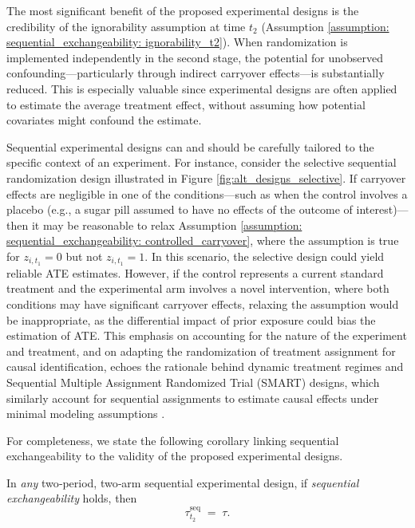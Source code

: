 The most significant benefit of the proposed experimental designs is the credibility of the ignorability assumption at time \(t_2\) (Assumption \ref{assumption: sequential_exchangeability: ignorability_t2}). When randomization is implemented independently in the second stage, the potential for unobserved confounding—particularly through indirect carryover effects—is substantially reduced. This is especially valuable since  experimental designs are often applied to estimate the average treatment effect, without assuming how potential covariates might confound the estimate. 

Sequential experimental designs can and should be carefully tailored to the specific context of an experiment. For instance, consider the selective sequential randomization design illustrated in Figure \ref{fig:alt_designs_selective}. If carryover effects are negligible in one of the conditions—such as when the control involves a placebo (e.g., a sugar pill assumed to have no effects of the outcome of interest)—then it may be reasonable to relax Assumption \ref{assumption: sequential_exchangeability: controlled_carryover}, where the assumption is true for \(z_{i,t_1} = 0\) but not \(z_{i,t_1} = 1\). In this scenario, the selective design could yield reliable ATE estimates. However, if the control represents a current standard treatment and the experimental arm involves a novel intervention, where both conditions may have significant carryover effects, relaxing the assumption would be inappropriate, as the differential impact of prior exposure could bias the estimation of ATE. This emphasis on accounting for the nature of the experiment and treatment, and on adapting the randomization of treatment assignment for causal identification, echoes the rationale behind dynamic treatment regimes and Sequential Multiple Assignment Randomized Trial (SMART) designs, which similarly account for sequential assignments to estimate causal effects under minimal modeling assumptions \citep{25_SMARTDesign}.

For completeness, we state the following corollary linking sequential exchangeability to the validity of the proposed experimental designs.

\begin{cor}
\label{cor: two-period-two-arm}
  In \emph{any} two‐period, two‐arm sequential experimental design, if \emph{sequential exchangeability}
  holds, then
  \[
    \tau_{t_2}^{\mathrm{seq}} \;=\; \tau.
  \]
\end{cor} 

